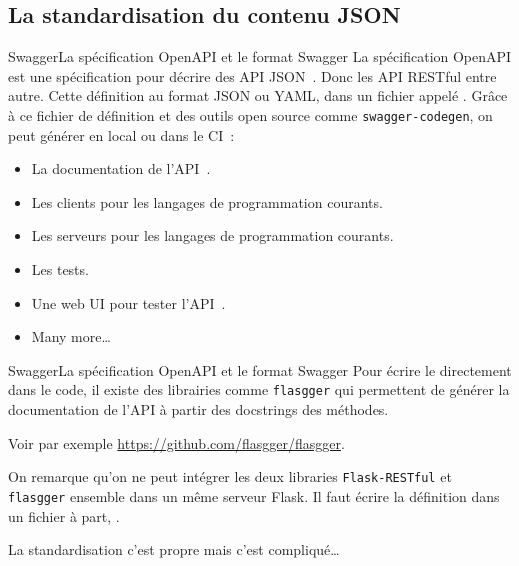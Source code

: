 \documentclass{beamer}
\begin{document}
    \subsection{La standardisation du contenu JSON}\label{subsec:api-json}

    \begin{frame}[fragile]{Swagger}{La spécification OpenAPI et le format Swagger}
        La spécification OpenAPI est une spécification pour décrire des API JSON~.
        Donc les API RESTful entre autre.
        \bigbreak
        Cette définition au format JSON ou YAML, dans un fichier appelé .
        \bigbreak
        Grâce à ce fichier de définition et des outils open source comme \lstinline{swagger-codegen}, on peut générer en local ou dans le CI~:
        \begin{itemize}
            \item La documentation de l'API~.
            \item Les clients pour les langages de programmation courants.
            \item Les serveurs pour les langages de programmation courants.
            \item Les tests.
            \item Une web UI pour tester l'API~.
            \item Many more\ldots
        \end{itemize}
    \end{frame}

    \begin{frame}[fragile]{Swagger}{La spécification OpenAPI et le format Swagger}
        Pour écrire le  directement dans le code, il existe des librairies comme \lstinline{flasgger} qui permettent de générer la documentation de l'API à partir des docstrings des méthodes.

        Voir par exemple \url{https://github.com/flasgger/flasgger}.
        \begin{dangercolorbox}
            On remarque qu'on ne peut intégrer les deux libraries \lstinline{Flask-RESTful} et \lstinline{flasgger} ensemble dans un même serveur Flask.
            Il faut écrire la définition dans un fichier  à part, .

            La standardisation c'est propre mais c'est compliqué\ldots
        \end{dangercolorbox}
    \end{frame}
\end{document}
